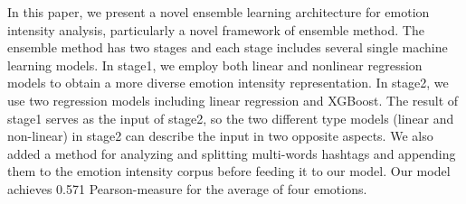 In this paper, we present a novel ensemble learning architecture for emotion intensity analysis, particularly a novel framework of ensemble method. The ensemble method has two stages and each stage includes several single machine learning models. In stage1, we employ both linear and nonlinear regression models to obtain a more diverse emotion intensity representation. In stage2, we use two regression models including linear regression and XGBoost. The result of stage1 serves as the input of stage2, so the two different type models (linear and non-linear) in stage2 can describe the input in two opposite aspects. We also added a method for analyzing and splitting multi-words hashtags and appending them to the emotion intensity corpus before feeding it to our model. Our model achieves 0.571 Pearson-measure for the average of four emotions.
